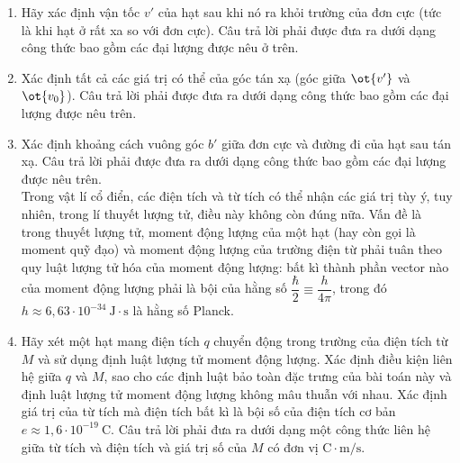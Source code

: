 \begin{vd}
\begin{center}
\end{center}
\begin{enumerate}[1)]
    \item Hãy xác định vận tốc $v'$ của hạt sau khi nó ra khỏi trường của đơn cực (tức là khi hạt ở rất xa so với đơn cực). Câu trả lời phải được đưa ra dưới dạng công thức bao gồm các đại lượng được nêu ở trên.
    \item Xác định tất cả các giá trị có thể của góc tán xạ (góc giữa $\ot{v'}$ và $\ot{v_0}$). Câu trả lời phải được đưa ra dưới dạng công thức bao gồm các đại lượng được nêu trên.
    \item Xác định khoảng cách vuông góc $b'$ giữa đơn cực và đường đi của hạt sau tán xạ. Câu trả lời phải được đưa ra dưới dạng công thức bao gồm các đại lượng được nêu trên.\\
    Trong vật lí cổ điển, các điện tích và từ tích có thể nhận các giá trị tùy ý, tuy nhiên, trong lí thuyết lượng tử, điều này không còn đúng nữa. Vấn đề là trong thuyết lượng tử, moment động lượng của một hạt (hay còn gọi là moment quỹ đạo) và moment động lượng của trường điện từ phải tuân theo quy luật lượng tử hóa của moment động lượng: bất kì thành phần vector nào của moment động lượng phải là bội của hằng số $\dfrac{\hbar}{2}\equiv\dfrac{h}{4\pi}$, trong đó $h\approx 6,63\cdot10^{-34}~\mathrm{J\cdot s}$ là hằng số Planck.
    \item Hãy xét một hạt mang điện tích $q$ chuyển động trong trường của điện tích từ $M$ và sử dụng định luật lượng tử moment động lượng. Xác định điều kiện liên hệ giữa $q$ và $M$, sao cho các định luật bảo toàn đặc trưng của bài toán này và định luật lượng tử moment động lượng không mâu thuẫn với nhau. Xác định giá trị của từ tích mà điện tích bất kì là bội số của điện tích cơ bản $e\approx 1,6\cdot 10^{-19}~\mathrm{C}$. Câu trả lời phải đưa ra dưới dạng một công thức liên hệ giữa từ tích và điện tích và giá trị số của $M$ có đơn vị $\mathrm{C\cdot m/s}$. 
\end{enumerate}
\end{vd}
